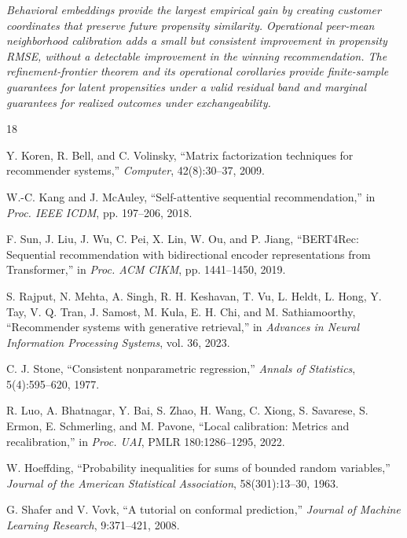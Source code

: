\documentclass[11pt]{article}
\theoremstyle{noteplain}
\theoremstyle{definition}
\begin{document}
\begin{center}
\emph{Behavioral embeddings provide the largest empirical gain by creating customer coordinates that preserve future propensity similarity. Operational peer-mean neighborhood calibration adds a small but consistent improvement in propensity RMSE, without a detectable improvement in the winning recommendation. The refinement-frontier theorem and its operational corollaries provide finite-sample guarantees for latent propensities under a valid residual band and marginal guarantees for realized outcomes under exchangeability.}
\end{center}

\begin{thebibliography}{18}\scriptsize
\setlength{\itemsep}{.12ex}
\setlength{\parskip}{0pt}

Y. Koren, R. Bell, and C. Volinsky, ``Matrix factorization techniques for recommender systems,'' \emph{Computer}, 42(8):30--37, 2009.

W.-C. Kang and J. McAuley, ``Self-attentive sequential recommendation,'' in \emph{Proc. IEEE ICDM}, pp. 197--206, 2018.

F. Sun, J. Liu, J. Wu, C. Pei, X. Lin, W. Ou, and P. Jiang, ``BERT4Rec: Sequential recommendation with bidirectional encoder representations from Transformer,'' in \emph{Proc. ACM CIKM}, pp. 1441--1450, 2019.

S. Rajput, N. Mehta, A. Singh, R. H. Keshavan, T. Vu, L. Heldt, L. Hong, Y. Tay, V. Q. Tran, J. Samost, M. Kula, E. H. Chi, and M. Sathiamoorthy, ``Recommender systems with generative retrieval,'' in \emph{Advances in Neural Information Processing Systems}, vol. 36, 2023.

C. J. Stone, ``Consistent nonparametric regression,'' \emph{Annals of Statistics}, 5(4):595--620, 1977.

R. Luo, A. Bhatnagar, Y. Bai, S. Zhao, H. Wang, C. Xiong, S. Savarese, S. Ermon, E. Schmerling, and M. Pavone, ``Local calibration: Metrics and recalibration,'' in \emph{Proc. UAI}, PMLR 180:1286--1295, 2022.

W. Hoeffding, ``Probability inequalities for sums of bounded random variables,'' \emph{Journal of the American Statistical Association}, 58(301):13--30, 1963.

G. Shafer and V. Vovk, ``A tutorial on conformal prediction,'' \emph{Journal of Machine Learning Research}, 9:371--421, 2008.


\end{thebibliography}
\end{document}
